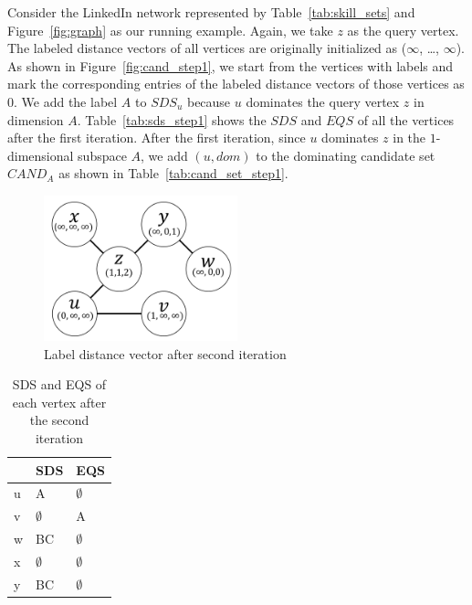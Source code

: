 Consider the LinkedIn network represented by Table~\ref{tab:skill_sets} and Figure~\ref{fig:graph} as our running example. Again, we take $z$ as the query vertex. The labeled distance vectors of all vertices are originally initialized as ($\infty$, \dots, $\infty$). As shown in Figure~\ref{fig:cand_step1}, we start from the vertices with labels and mark the corresponding entries of the labeled distance vectors of those vertices as $0$. 
We add the label $A$ to $\mathit{SDS}_u$ because $u$ dominates the query vertex $z$ in dimension $A$. Table~\ref{tab:sds_step1} shows the $\mathit{SDS}$ and $\mathit{EQS}$ of all the vertices after the first iteration.
After the first iteration, since $u$ dominates $z$ in the $1$-dimensional subspace $A$, we add $(u, dom)$ to the dominating candidate set $\mathit{CAND}_A$ as shown in Table~\ref{tab:cand_set_step1}.

\begin{figure}[H]
    \centering
    \includegraphics[width=0.5\textwidth]{figs/graph_example_2}
    \caption{Label distance vector after second iteration}
    \label{fig:cand_step2}
\end{figure}

\begin{table}[H]
    \centering
    \begin{tabular}{|l|l|l|}
    \hline
      & SDS         & EQS         \\ \hline
    u & A           & $\emptyset$ \\ \hline
    v & $\emptyset$ & A           \\ \hline
    w & BC          & $\emptyset$ \\ \hline
    x & $\emptyset$ & $\emptyset$ \\ \hline
    y & BC          & $\emptyset$ \\ \hline
    \end{tabular}
    \caption{SDS and EQS of each vertex after the second iteration}
    \label{tab:sds_step2}
\end{table}

